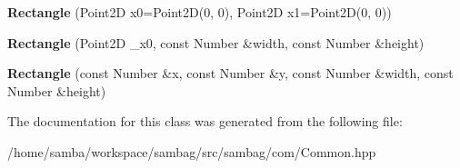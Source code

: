 \begin{DoxyCompactItemize}
\item 
\hypertarget{classsambag_1_1com_1_1_rectangle_ae7c887c3789dfb301923f7bede73c529}{
{\bfseries Rectangle} (Point2D x0=Point2D(0, 0), Point2D x1=Point2D(0, 0))}
\label{classsambag_1_1com_1_1_rectangle_ae7c887c3789dfb301923f7bede73c529}

\item 
\hypertarget{classsambag_1_1com_1_1_rectangle_a4fc6e60c0d700ea737b8eca53c827f03}{
{\bfseries Rectangle} (Point2D \_\-x0, const Number \&width, const Number \&height)}
\label{classsambag_1_1com_1_1_rectangle_a4fc6e60c0d700ea737b8eca53c827f03}

\item 
\hypertarget{classsambag_1_1com_1_1_rectangle_ae517cb9d51d100205e822325fdd2367d}{
{\bfseries Rectangle} (const Number \&x, const Number \&y, const Number \&width, const Number \&height)}
\label{classsambag_1_1com_1_1_rectangle_ae517cb9d51d100205e822325fdd2367d}

\end{DoxyCompactItemize}


The documentation for this class was generated from the following file:\begin{DoxyCompactItemize}
\item 
/home/samba/workspace/sambag/src/sambag/com/Common.hpp\end{DoxyCompactItemize}
